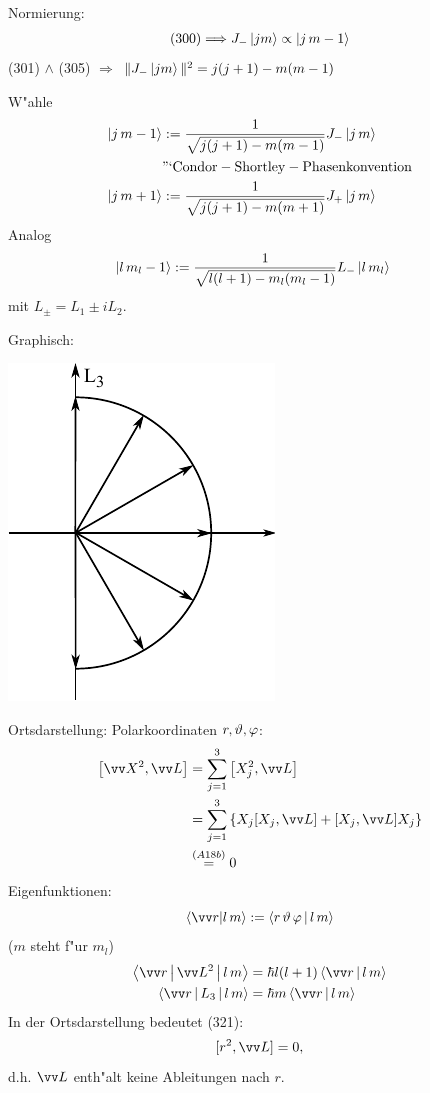 \documentclass[a4paper]{scrartcl}
\renewcommand{\phi}{\ensuremath \varphi}
\newcommand{\eqn}[1]{\begin{align} #1 \end{align}}
\newcommand{\spl}[1]{\begin{split} #1 \end{split}}
\begin{document}
{Normierung:
\eqn{ \mathrm{(300)} \Longrightarrow J_- \Ket{ jm } \propto \Ket{ j \, m-1}}
(301) $\wedge$ (305) $\Longrightarrow$ $\Vert J_- \Ket{j m} \Vert^2 = j(j+1) - m(m-1)$

W"ahle
\eqn{
\Ket{j \, m-1} & := \frac 1 {\sqrt{j(j+1) - m(m-1)}} J_- \Ket{ j \, m } \\
& \mathrm{"`Condor-Shortley-Phasenkonvention} \notag\\
\Ket{j \, m+1 } & := \frac 1 {\sqrt{j(j+1) - m(m+1)}} J_+ \Ket{ j \, m }
}
Analog
\eqn{ \Ket{ l \, m_l - 1} & := \frac 1 {\sqrt{l(l+1) - m_l(m_l-1)}} L_- \Ket{ l \, m_l }}
mit $L_\pm = L_1 \pm i L_2$.

Graphisch:
\begin{center}
\includegraphics{320L3}
\end{center}
Ortsdarstellung: Polarkoordinaten $r, \vartheta, \phi$:
\eqn{ 
\spl{
\left[ \vv X^2, \vv L \right] & = \sum_{j=1}^3 \left[ X_j^2, \vv L \right] \\
& = \sum_{j=1}^3 \left\{ X_j [X_j, \vv L] + [X_j, \vv L] X_j \right\} \\
& \stackrel{(A18b)}=0
}}
Eigenfunktionen:
$$ \braket{ \vv r | l \, m } := \Braket{ r \, \vartheta \, \phi | l \, m }$$
($m$ steht f"ur $m_l$)
\eqn{
\spl{
\Braket{ \vv r | \vv L^2  | l \, m } & = \hbar l (l+1) \Braket{ \vv r| l \, m } \\
\Braket{ \vv r | L_3 | l \, m } & = \hbar m \Braket{ \vv r | l \, m }
}
}
In der Ortsdarstellung bedeutet (321):
$$[r^2, \vv L ] = 0,$$
d.h. $\vv L$ enth"alt keine Ableitungen nach $r$.

}
\end{document}
